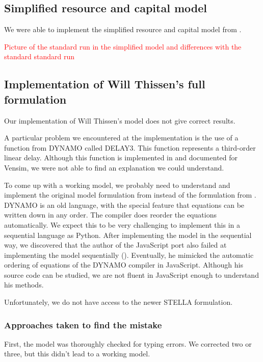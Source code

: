 \documentclass[10pt,a4paper]{scrartcl}
\begin{document}
\subsection*{Simplified resource and capital model}

We were able to implement the simplified resource and capital model from \cite{thissen1978investigations}.

\textcolor{red}{Picture of the standard run in the simplified model and differences with the standard standard run}

\subsection*{Implementation of Will Thissen's full formulation}

Our implementation of Will Thissen's model does not give correct results.

A particular problem we encountered at the implementation is the use of a function from DYNAMO called DELAY3. This function represents a third-order linear delay. Although this function is implemented in and documented for Vensim, we were not able to find an explanation we could understand.

To come up with a working model, we probably need to understand and implement the original model formulation from \cite{forresterworld} instead of the formulation from \cite{thissen1978investigations}. DYNAMO is an old language, with the special feature that equations can be written down in any order. The compiler does reorder the equations automatically. We expect this to be very challenging to implement this in a sequential language as Python.  After implementing the model in the sequential way, we discovered that the author of the JavaScript port also failed at implementing the model sequentially (\cite{blogpost}). Eventually, he mimicked the automatic ordering of equations of the DYNAMO compiler in JavaScript. Although his source code can be studied, we are not fluent in JavaScript enough to understand his methods.

Unfortunately, we do not have access to the newer STELLA formulation.

\subsubsection*{Approaches taken to find the mistake}

First, the model was thoroughly checked for typing errors. We corrected two or three, but this didn't lead to a working model.
\end{document}
